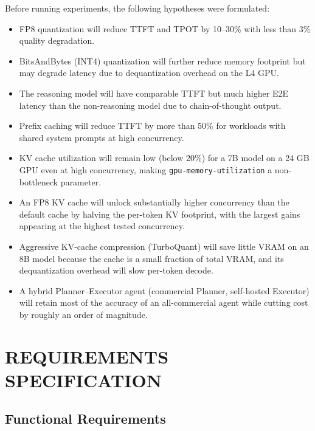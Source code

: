 \documentclass[a4paper,12pt]{report}
\begin{document}
Before running experiments, the following hypotheses were formulated:

\begin{itemize}
    \item FP8 quantization will reduce TTFT and TPOT by 10--30\% with less than 3\% quality degradation.
    \item BitsAndBytes (INT4) quantization will further reduce memory footprint but may degrade latency due to dequantization overhead on the L4 GPU.
    \item The reasoning model will have comparable TTFT but much higher E2E latency than the non-reasoning model due to chain-of-thought output.
    \item Prefix caching will reduce TTFT by more than 50\% for workloads with shared system prompts at high concurrency.
    \item KV cache utilization will remain low (below 20\%) for a 7B model on a 24 GB GPU even at high concurrency, making \texttt{gpu-memory-utilization} a non-bottleneck parameter.
    \item An FP8 KV cache will unlock substantially higher concurrency than the default cache by halving the per-token KV footprint, with the largest gains appearing at the highest tested concurrency.
    \item Aggressive KV-cache compression (TurboQuant) will save little VRAM on an 8B model because the cache is a small fraction of total VRAM, and its dequantization overhead will slow per-token decode.
    \item A hybrid Planner--Executor agent (commercial Planner, self-hosted Executor) will retain most of the accuracy of an all-commercial agent while cutting cost by roughly an order of magnitude.
\end{itemize}

\chapter{REQUIREMENTS SPECIFICATION}

\section{Functional Requirements}
\end{document}
